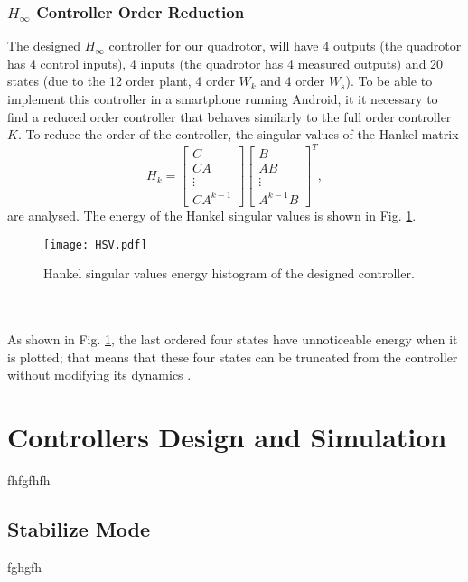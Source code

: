 \subsubsection{$H_\infty$ Controller Order Reduction}
The designed $H_{\infty}$ controller for our quadrotor, will have 4 outputs (the quadrotor has 4 control inputs), 4 inputs (the quadrotor has 4 measured outputs) and 20 states (due to the 12 order plant, 4 order $W_{k}$ and 4 order $W_s$). To be able to implement this controller in a smartphone running Android, it it necessary to find a reduced order controller that behaves similarly to the full order controller $K$. To reduce the order of the controller, the singular values of the Hankel matrix
\begin{equation}
H_{k} = \begin{bmatrix}
C\\
CA\\
\vdots\\
CA^{k-1}
\end{bmatrix}
\begin{bmatrix}
B\\ AB \\ \vdots \\ A^{k-1}B
\end{bmatrix}^{T},
\end{equation}
are analysed. The energy of the Hankel singular values is shown in Fig. \ref{fig:hsv}.
\begin{figure}[h]
\begin{center}
\texttt{[image: HSV.pdf]}  
\caption{Hankel singular values energy histogram of the designed controller.} 
\label{fig:hsv}
\end{center}
\end{figure}
\\\\As shown in Fig. \ref{fig:hsv}, the last ordered four states have unnoticeable energy when it is plotted; that means that these four states can be truncated from the controller without modifying its dynamics \cite{Skogestad2005}. 

\section{Controllers Design and Simulation}
\label{sec:controldesign}
fhfgfhfh
\subsection{Stabilize Mode}
fghgfh

